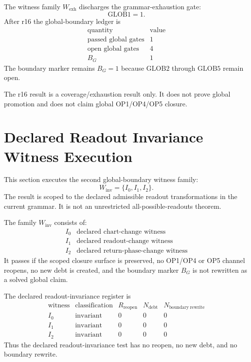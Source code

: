 \begin{theorem}
The witness family \(W_{\mathrm{exh}}\) discharges the grammar-exhaustion gate:
\[
    \mathrm{GLOB1}=1.
\]
After r16 the global-boundary ledger is
\[
\begin{array}{c|r}
\text{quantity} & \text{value}\\
\hline
\text{passed global gates} & 1\\
\text{open global gates} & 4\\
B_G & 1
\end{array}
\]
The boundary marker remains \(B_G=1\) because \(\mathrm{GLOB2}\) through
\(\mathrm{GLOB5}\) remain open.
\end{theorem}

\begin{remark}
The r16 result is a coverage/exhaustion result only.  It does not prove global
promotion and does not claim global OP1/OP4/OP5 closure.
\end{remark}



\section{Declared Readout Invariance Witness Execution}
\label{sec:v450-r17-execute-winv-readout-invariance}

This section executes the second global-boundary witness family:
\[
    W_{\mathrm{inv}}=\{I_0,I_1,I_2\}.
\]
The result is scoped to the declared admissible readout transformations in the
current grammar.  It is not an unrestricted all-possible-readouts theorem.

\begin{definition}
The family \(W_{\mathrm{inv}}\) consists of:
\[
\begin{array}{c|l}
I_0 & \text{declared chart-change witness}\\
I_1 & \text{declared readout-change witness}\\
I_2 & \text{declared return-phase-change witness}
\end{array}
\]
It passes if the scoped closure surface is preserved, no OP1/OP4 or OP5
channel reopens, no new debt is created, and the boundary marker \(B_G\) is not
rewritten as a solved global claim.
\end{definition}

\begin{proposition}
The declared readout-invariance register is
\[
\begin{array}{c|c|r|r|r}
\text{witness} & \text{classification} & R_{\mathrm{reopen}} & N_{\mathrm{debt}} & N_{\mathrm{boundary\ rewrite}}\\
\hline
I_0 & \text{invariant} & 0 & 0 & 0\\
I_1 & \text{invariant} & 0 & 0 & 0\\
I_2 & \text{invariant} & 0 & 0 & 0
\end{array}
\]
Thus the declared readout-invariance test has no reopen, no new debt, and no
boundary rewrite.
\end{proposition}


